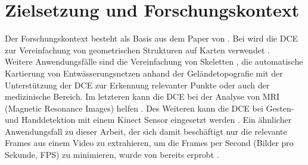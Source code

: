\section{Zielsetzung und Forschungskontext}
{%
Der Forschungskontext besteht als Basis aus dem Paper von \citeauthor*{Dorr2015}. Bei \citeauthor*{Barkowsky2000} wird die DCE zur Vereinfachung von geometrischen Strukturen auf Karten verwendet \citep{Barkowsky2000}. \\
Weitere Anwendungsfälle sind die Vereinfachung von Skeletten \citep{Latecki2007}, die automatische Kartierung von Entwässerungsnetzen anhand der Geländetopografie mit der Unterstützung der DCE zur Erkennung relevanter Punkte \citep{ZHENG201517} oder auch der medizinische Bereich. Im letzteren kann die DCE bei der Analyse von MRI (Magnetic Resonance Images) helfen \citep{Supot2007}. Des Weiteren kann die DCE bei Gesten- und Handdetektion mit einem Kinect Sensor eingesetzt werden \citep{Lai2016}. Ein ähnlicher Anwendungsfall zu dieser Arbeit, der sich damit beschäftigt nur die relevante Frames aus einem Video zu extrahieren, um die Frames per Second (\glqq Bilder pro Sekunde\grqq{}, FPS) zu minimieren, wurde von \citeauthor*{Latecki2000a} bereits erprobt \citep{Latecki2000a}. \\


}
